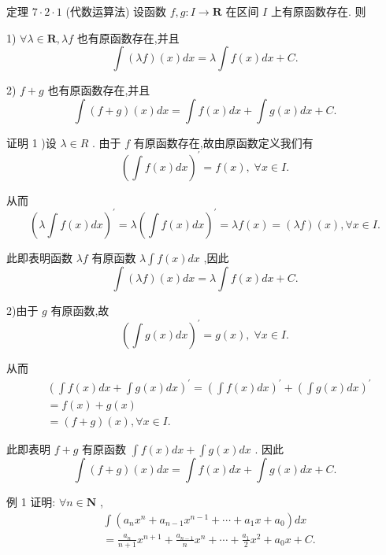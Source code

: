 定理 $7 \cdot  2 \cdot  1$ (代数运算法) 设函数 $f,g : I \rightarrow  \mathbf{R}$ 在区间 $I$ 上有原函数存在. 则

1) $\forall \lambda  \in  \mathbf{R},{\lambda f}$ 也有原函数存在,并且
$$\int \left( {\lambda f}\right) \left( x\right) {dx} = \lambda \int f\left( x\right) {dx} + C.$$

2) $f + g$ 也有原函数存在,并且
$$\int \left( {f + g}\right) \left( x\right) {dx} = \int f\left( x\right) {dx} + \int g\left( x\right) {dx} + C.$$

证明 1 )设 $\lambda  \in  R$ . 由于 $f$ 有原函数存在,故由原函数定义我们有
$${\left( \int f\left( x\right) dx\right) }^{\prime } = f\left( x\right) ,\;\forall x \in  I.$$

从而
$${\left( \lambda \int f\left( x\right) dx\right) }^{\prime } = \lambda {\left( \int f\left( x\right) dx\right) }^{\prime } = {\lambda f}\left( x\right)  = \left( {\lambda f}\right) \left( x\right) ,\forall x \in  I.$$

此即表明函数 ${\lambda f}$ 有原函数 $\lambda \int f\left( x\right) {dx}$ ,因此
$$\int \left( {\lambda f}\right) \left( x\right) {dx} = \lambda \int f\left( x\right) {dx} + C.$$

2)由于 $g$ 有原函数,故
$${\left( \int g\left( x\right) dx\right) }^{\prime } = g\left( x\right) ,\;\forall x \in  I.$$

从而
\begin{align*}
	&{\left( \int f\left( x\right) dx+\int g\left( x\right) dx\right) }^{\prime } = {\left( \int f\left( x\right) dx\right) }^{\prime } + {\left( \int g\left( x\right) dx\right) }^{\prime }\\
	&= f\left( x\right)  + g\left( x\right)\\
	&= \left( {f + g}\right) \left( x\right) ,\forall x \in  I.
\end{align*}

此即表明 $f + g$ 有原函数 $\int f\left( x\right) {dx} + \int g\left( x\right) {dx}$ . 因此
$$\int \left( {f + g}\right) \left( x\right) {dx} = \int f\left( x\right) {dx} + \int g\left( x\right) {dx} + C.$$

例 1 证明: $\forall n \in  \mathbf{N}$ ,
\begin{align*}
	&\int \left( {{a}_{n}{x}^{n} + {a}_{n - 1}{x}^{n - 1} + \cdots  + {a}_{1}x + {a}_{0}}\right) {dx}\\
	&= \frac{{a}_{n}}{n + 1}{x}^{n + 1} + \frac{{a}_{n - 1}}{n}{x}^{n} + \cdots  + \frac{{a}_{1}}{2}{x}^{2} + {a}_{0}x + C.
\end{align*}


